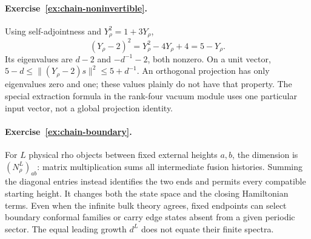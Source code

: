 \paragraph{Exercise~\ref{ex:chain-noninvertible}.}
\label{sol:ex:chain-noninvertible}
Using self-adjointness and $Y_\rho^2=1+3Y_\rho$,
\[
 (Y_\rho-2)^2=Y_\rho^2-4Y_\rho+4=5-Y_\rho.
\]
Its eigenvalues are $d-2$ and $-d^{-1}-2$, both nonzero. On a unit
vector,
$5-d\leq\|(Y_\rho-2)s\|^2\leq5+d^{-1}$.
An orthogonal projection has only eigenvalues zero and one;
these values plainly do not have that property. The special
extraction formula in the rank-four vacuum module uses one
particular input vector, not a global projection identity.



\paragraph{Exercise~\ref{ex:chain-boundary}.}
\label{sol:ex:chain-boundary}
For $L$ physical rho objects between fixed external heights $a,b$,
the dimension is $(N_\rho^L)_{ab}$: matrix multiplication sums
all intermediate fusion histories. Summing the diagonal entries
instead identifies the two ends and permits every compatible
starting height. It changes both the state space and the closing
Hamiltonian terms. Even when the infinite bulk theory agrees,
fixed endpoints can select boundary conformal families or carry
edge states absent from a given periodic sector. The equal leading
growth $d^L$ does not equate their finite spectra.


